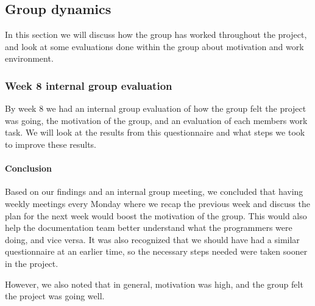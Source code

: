 \subsection{Group dynamics}
In this section we will discuss how the group has worked throughout the project, and look at some evaluations done within the group about motivation and work environment. 

\subsubsection{Week 8 internal group evaluation}
By week 8 we had an internal group evaluation of how the group felt the project was going, the motivation of the group, and an evaluation of each members work task. We will look at the results from this questionnaire and what steps we took to improve these results.



\paragraph{Conclusion}
Based on our findings and an internal group meeting, we concluded that having weekly meetings every Monday where we recap the previous week and discuss the plan for the next week would boost the motivation of the group. This would also help the documentation team better understand what the programmers were doing, and vice versa. It was also recognized that we should have had a similar questionnaire at an earlier time, so the necessary steps needed were taken sooner in the project.

However, we also noted that in general, motivation was high, and the group felt the project was going well.
